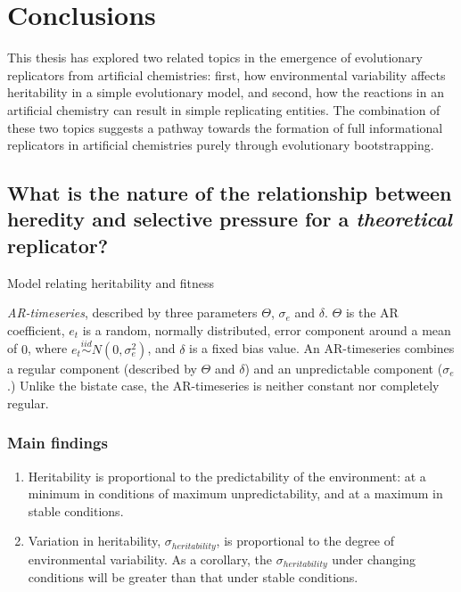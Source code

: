 \chapter{Conclusions}\label{thesis-conclusions}

This thesis has explored two related topics in the emergence of evolutionary replicators from artificial chemistries: first, how environmental variability affects heritability in a simple evolutionary model, and second, how the reactions in an artificial chemistry can result in simple replicating entities. The combination of these two topics suggests a pathway towards the formation of full informational replicators in artificial chemistries purely through evolutionary bootstrapping.

\section{What is the nature of the relationship between heredity and selective pressure for a \emph{theoretical} replicator?}

Model relating heritability and fitness

\emph{AR-timeseries}, described by three parameters $\Theta$, $\sigma_e$ and $\delta$. $\Theta$ is the AR coefficient, $e_t$ is a random, normally distributed, error component around a mean of $0$, where $e_t\stackrel{iid}{\sim}N(0,\sigma^{2}_e)$, and $\delta$ is a fixed bias value. An AR-timeseries combines a regular component (described by $\Theta$ and $\delta$) and an unpredictable component ($\sigma_e$.) Unlike the bistate case, the AR-timeseries is neither constant nor completely regular.

\subsection{Main findings}

\begin{enumerate}
\item Heritability is proportional to the predictability of the environment: at a minimum in conditions of maximum unpredictability, and at a maximum in stable conditions.
\item Variation in heritability, $\sigma_{heritability}$, is proportional to the degree of environmental variability. As a corollary, the $\sigma_{heritability}$ under changing conditions will be greater than that under stable conditions.
\end{enumerate}

